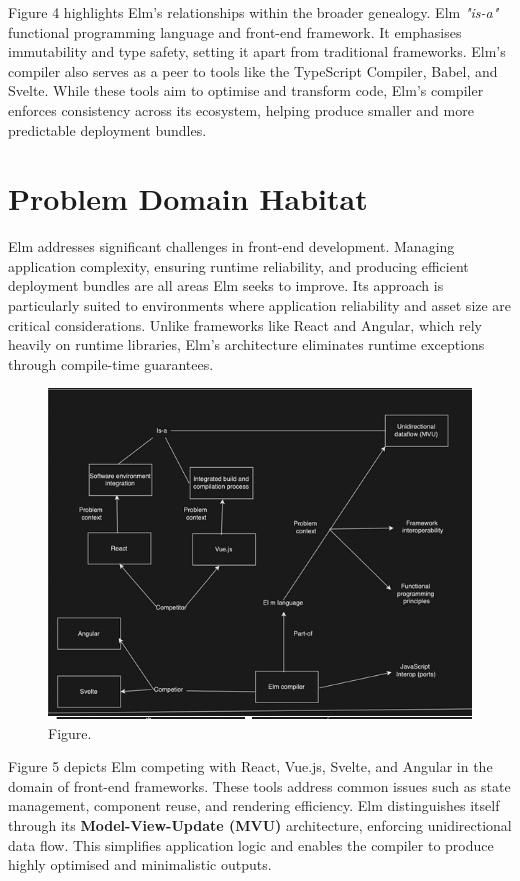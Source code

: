 Figure 4 highlights Elm's relationships within the broader genealogy. Elm \textit{"is-a"} functional programming language and front-end framework. It emphasises immutability and type safety, setting it apart from traditional frameworks. Elm’s compiler also serves as a peer to tools like the TypeScript Compiler, Babel, and Svelte. While these tools aim to optimise and transform code, Elm’s compiler enforces consistency across its ecosystem, helping produce smaller and more predictable deployment bundles.

\section{Problem Domain Habitat}
Elm addresses significant challenges in front-end development. Managing application complexity, ensuring runtime reliability, and producing efficient deployment bundles are all areas Elm seeks to improve. Its approach is particularly suited to environments where application reliability and asset size are critical considerations. Unlike frameworks like React and Angular, which rely heavily on runtime libraries, Elm's architecture eliminates runtime exceptions through compile-time guarantees.

\begin{figure}[thb]
	\centering
	\includegraphics[scale=0.5]{figs/diagram2.png}
	\caption{Figure.}
	\label{fig:diagram2}
\end{figure}

Figure 5 depicts Elm competing with React, Vue.js, Svelte, and Angular in the domain of front-end frameworks. These tools address common issues such as state management, component reuse, and rendering efficiency. Elm distinguishes itself through its \textbf{Model-View-Update (MVU)} architecture, enforcing unidirectional data flow. This simplifies application logic and enables the compiler to produce highly optimised and minimalistic outputs.


